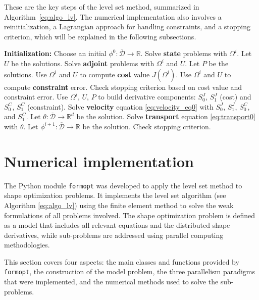 \documentclass[preprint,9pt]{elsarticle}
\begin{document}
These are the key steps of the level set method,
summarized in Algorithm~\ref{eq:algo_lv}.
The numerical implementation also involves a reinitialization,
a Lagrangian approach for handling constraints, and a stopping criterion,
which will be explained in the following subsections.

\begin{algorithm}
\caption{Level set algorithm} \label{eq:algo_lv}
\small
\begin{algorithmic}[1]
\State \textbf{Initialization:}
Choose an initial $\phi^0:\overline{\mathcal{D}}\to\mathds{R}$.
\State Solve \textbf{state} problems with $\Omega^i$.
Let $U$ be the solutions.
\State Solve \textbf{adjoint} problems with $\Omega^i$ and $U$.
 Let $P$ be the solutions.
\State Use $\Omega^i$ and $U$ to compute \textbf{cost} value $J(\Omega^i)$.
\State Use $\Omega^i$ and $U$ to compute \textbf{constraint} error.
\State Check stopping criterion based on cost value
and constraint error.
\State Use $\Omega^i$, $U$, $P$ to build derivative components:
$S_0^{J}$, $S_1^{J}$ (cost)%
		and $S_0^{C}$, $S_1^{C}$ (constraint).
\State Solve \textbf{velocity} equation \eqref{eq:velocity_eq0} with
$S_0^{J}$, $S_1^{J}$, $S_0^{C}$, and $S_1^{C}$.
Let $\theta\colon\overline{\mathcal{D}}\to\mathds{R}^d$ be the solution.
\State Solve \textbf{transport} equation \eqref{eq:transport0} with $\theta$.
Let $\phi^{i+1}\colon\overline{\mathcal{D}}\to\mathds{R}$ be the solution.
\State Check stopping criterion.
\EndFor
\end{algorithmic}
\end{algorithm}


\section{Numerical implementation}\label{sec:numerics}

The Python module \texttt{formopt} was developed to apply
the level set method to shape optimization problems.
It implements the level set algorithm (see Algorithm \ref{eq:algo_lv}) using
the finite element method to solve
the weak formulations of all problems involved.
The shape optimization problem is defined as a model that includes
all relevant equations and the distributed shape derivatives,
while sub-problems are addressed using parallel computing methodologies.

This section covers four aspects:
the main classes and functions provided by \texttt{formopt},
the construction of the model problem,
the three parallelism paradigms that were implemented,
and the numerical methods used to solve the sub-problems.
\end{document}
